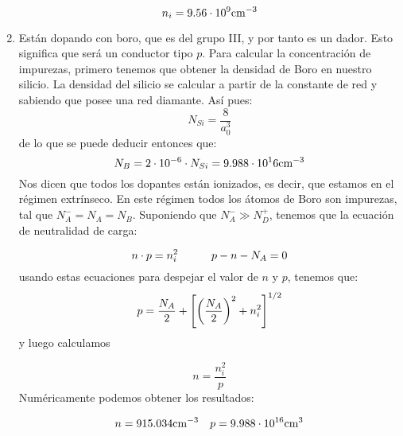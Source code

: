 \begin{texercise}
\begin{enumerate}[label=\alph*)]
		\begin{equation}
			n_i = 9.56 \cdot 10^9 \text{cm}^{-3}
		\end{equation}


		\item Están dopando con boro, que es del grupo III, y por tanto es un dador. Esto significa que será un conductor tipo $p$. Para calcular la concentración de impurezas, primero tenemos que obtener la densidad de Boro en nuestro silicio. La densidad del silicio se calcular a partir de la constante de red y sabiendo que posee una red diamante. Así pues:
		\begin{equation}
			N_{Si} = \frac{8}{a_0^3} 
		\end{equation}
		de lo que se puede deducir entonces que:
		\begin{equation}
			N_B = 2\cdot 10^{-6} \cdot N_{Si} = 9.988 \cdot 10^16 \text{cm}^{-3}
		\end{equation}
		Nos dicen que todos los dopantes están ionizados, es decir, que estamos en el régimen extrínseco. En este régimen todos los átomos de Boro son impurezas, tal que $N_A^-=N_A=N_B$. Suponiendo que $N_A^- \gg N_D^+$, tenemos que la ecuación de neutralidad de carga:

		\begin{equation}
			n\cdot p = n_i^2 \quad \quad \quad p-n-N_A = 0 
		\end{equation}
		usando estas ecuaciones para despejar el valor de $n$ y $p$, tenemos que:	
		\begin{equation}
			p = \frac{N_A}{2} + \left[ \left( \frac{N_A}{2} \right)^2 + n_i^2 \right]^{1/2} 
		\end{equation}
		y luego calculamos 

		\begin{equation}
			n = \frac{n_i^2}{p}
		\end{equation}
		Numéricamente podemos obtener los resultados:

		\begin{equation}
			n=915.034 \text{cm}^{-3} \quad p = 9.988 \cdot 10^{16} \text{cm}^3
		\end{equation}



\end{enumerate}
\end{texercise}
